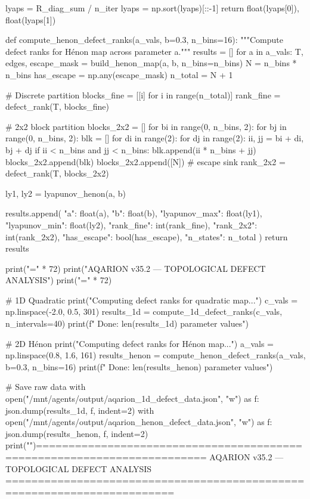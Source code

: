 {{{{{{{{{{{{{    lyaps = R_diag_sum / n_iter
    lyaps = np.sort(lyaps)[::-1]
    return float(lyaps[0]), float(lyaps[1])


def compute_henon_defect_ranks(a_vals, b=0.3, n_bins=16):
    """Compute defect ranks for Hénon map across parameter a."""
    results = []
    for a in a_vals:
        T, edges, escape_mask = build_henon_map(a, b, n_bins=n_bins)
        N = n_bins * n_bins
        has_escape = np.any(escape_mask)
        n_total = N + 1
        
        # Discrete partition
        blocks_fine = [[i] for i in range(n_total)]
        rank_fine = defect_rank(T, blocks_fine)
        
        # 2x2 block partition
        blocks_2x2 = []
        for bi in range(0, n_bins, 2):
            for bj in range(0, n_bins, 2):
                blk = []
                for di in range(2):
                    for dj in range(2):
                        ii, jj = bi + di, bj + dj
                        if ii < n_bins and jj < n_bins:
                            blk.append(ii * n_bins + jj)
                blocks_2x2.append(blk)
        blocks_2x2.append([N])  # escape sink
        rank_2x2 = defect_rank(T, blocks_2x2)
        
        ly1, ly2 = lyapunov_henon(a, b)
        
        results.append({
            "a": float(a),
            "b": float(b),
            "lyapunov_max": float(ly1),
            "lyapunov_min": float(ly2),
            "rank_fine": int(rank_fine),
            "rank_2x2": int(rank_2x2),
            "has_escape": bool(has_escape),
            "n_states": n_total
        })
    return results


print("=" * 72)
print("AQARION v35.2 — TOPOLOGICAL DEFECT ANALYSIS")
print("=" * 72)

# 1D Quadratic
print("\n[1D] Computing defect ranks for quadratic map...")
c_vals = np.linspace(-2.0, 0.5, 301)
results_1d = compute_1d_defect_ranks(c_vals, n_intervals=40)
print(f"  Done: {len(results_1d)} parameter values")

# 2D Hénon
print("\n[2D] Computing defect ranks for Hénon map...")
a_vals = np.linspace(0.8, 1.6, 161)
results_henon = compute_henon_defect_ranks(a_vals, b=0.3, n_bins=16)
print(f"  Done: {len(results_henon)} parameter values")

# Save raw data
with open("/mnt/agents/output/aqarion_1d_defect_data.json", "w") as f:
    json.dump(results_1d, f, indent=2)
with open("/mnt/agents/output/aqarion_henon_defect_data.json", "w") as f:
    json.dump(results_henon, f, indent=2)
print("")========================================================================
AQARION v35.2 — TOPOLOGICAL DEFECT ANALYSIS
========================================================================

}}}}}}}}}}}}}
